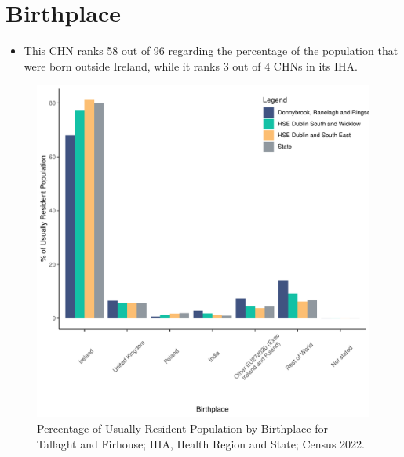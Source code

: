 \documentclass{article}
\begin{document}
\section{Birthplace}\label{sect:Birth}
\begin{itemize}
\item This CHN ranks  58 out of 96 regarding the percentage of the population that were born outside Ireland, while it ranks  3 out of 4 CHNs in its IHA.
\end{itemize}
\begin{figure}[H]
	\centering
	\includegraphics[width = 130mm]{../figures/BirthED.pdf}
	\caption{Percentage of Usually Resident Population by Birthplace for Tallaght and Firhouse; IHA, Health Region and State; Census 2022.}
	\label{fig:vbnv}
	\end{figure}
	
\end{document}
